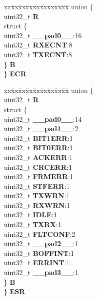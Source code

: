 \begin{DoxyCompactItemize}
\begin{tabbing}
\end{tabbing}\item 
\mbox{\label{structFLEXCAN2__tag_adfdd32edbb892db3682996a2d57fab76}} 
\begin{tabbing}
xx\=xx\=xx\=xx\=xx\=xx\=xx\=xx\=xx\=\kill
union \{\\
\>uint32\_t {\bfseries R}\\
\>struct \{\\
\>\>uint32\_t {\bfseries \_\_pad0\_\_}:16\\
\>\>uint32\_t {\bfseries RXECNT}:8\\
\>\>uint32\_t {\bfseries TXECNT}:8\\
\>\} {\bfseries B}\\
\} {\bfseries ECR}\\

\end{tabbing}\item 
\mbox{\label{structFLEXCAN2__tag_a11f25e9c29ef1891912f9af45d0ca0b8}} 
\begin{tabbing}
xx\=xx\=xx\=xx\=xx\=xx\=xx\=xx\=xx\=\kill
union \{\\
\>uint32\_t {\bfseries R}\\
\>struct \{\\
\>\>uint32\_t {\bfseries \_\_pad0\_\_}:14\\
\>\>uint32\_t {\bfseries \_\_pad1\_\_}:2\\
\>\>uint32\_t {\bfseries BIT1ERR}:1\\
\>\>uint32\_t {\bfseries BIT0ERR}:1\\
\>\>uint32\_t {\bfseries ACKERR}:1\\
\>\>uint32\_t {\bfseries CRCERR}:1\\
\>\>uint32\_t {\bfseries FRMERR}:1\\
\>\>uint32\_t {\bfseries STFERR}:1\\
\>\>uint32\_t {\bfseries TXWRN}:1\\
\>\>uint32\_t {\bfseries RXWRN}:1\\
\>\>uint32\_t {\bfseries IDLE}:1\\
\>\>uint32\_t {\bfseries TXRX}:1\\
\>\>uint32\_t {\bfseries FLTCONF}:2\\
\>\>uint32\_t {\bfseries \_\_pad2\_\_}:1\\
\>\>uint32\_t {\bfseries BOFFINT}:1\\
\>\>uint32\_t {\bfseries ERRINT}:1\\
\>\>uint32\_t {\bfseries \_\_pad3\_\_}:1\\
\>\} {\bfseries B}\\
\} {\bfseries ESR}\\


\end{tabbing}
\end{DoxyCompactItemize}
